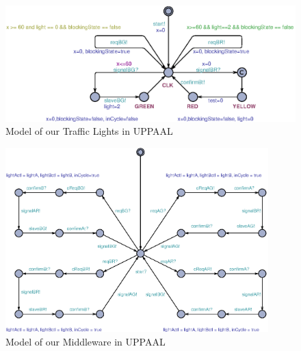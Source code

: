 \documentclass[conference]{../../setup/IEEEtran}
\begin{document}


\begin{figure}[!htb]
\centerline{\includegraphics[width=4.5in]{Figures/TrafficlightModel.eps}}
\caption{Model of our Traffic Lights in UPPAAL}
\label{fig:TrafficlightModel.eps}
\end{figure}

\begin{figure}[htbp]
\centering
\centerline{\includegraphics[width=4in]{Figures/MiddlewareModel.eps}}
\caption{Model of our Middleware in UPPAAL}
\label{fig:MiddlewareModel.eps}
\end{figure}
\end{document}
